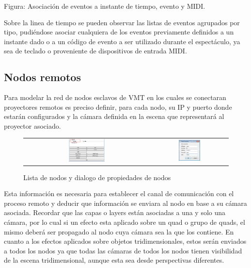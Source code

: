 Figura: Asociación de eventos a instante de tiempo, evento y MIDI.

Sobre la linea de tiempo se pueden observar las listas de eventos agrupados por tipo, pudiéndose asociar cualquiera de los eventos previamente definidos a un instante dado o a un código de evento a ser utilizado durante el espectáculo, ya sea de teclado o proveniente de dispositivos de entrada MIDI.

\subsection{Nodos remotos}

Para modelar la red de nodos esclavos de VMT en los cuales se conectaran proyectores remotos es preciso definir, para cada nodo, su IP y puerto donde estarán configurados y la cámara definida en la escena que representará al proyector asociado.

\begin{figure}
	\begin{center}
		\begin{tabular}[c]{cc}
			\includegraphics[width=0.3\textwidth]{./Cap5_vmt/vmt_nodeProperties_1.png}
				&        
			\includegraphics[width=0.3\textwidth]{./Cap5_vmt/vmt_nodeProperties_2.png}
		\end{tabular}
	\end{center}
	\caption{Lista de nodos y dialogo de propiedades de nodos}
	\label{fig:VMT-Nodes}
\end{figure}

Esta información es necesaria para establecer el canal de comunicación con el proceso remoto y deducir que información se enviara al nodo en base a su cámara asociada. Recordar que las capas o layers están asociadas a una y solo una cámara, por lo cual si un efecto esta aplicado sobre un quad o grupo de quads, el mismo deberá ser propagado al nodo cuya cámara sea la que los contiene. En cuanto a los efectos aplicados sobre objetos tridimensionales, estos serán enviados a todos los nodos ya que todas las cámaras de todos los nodos tienen visibilidad de la escena tridimensional, aunque esta sea desde perspectivas diferentes.

